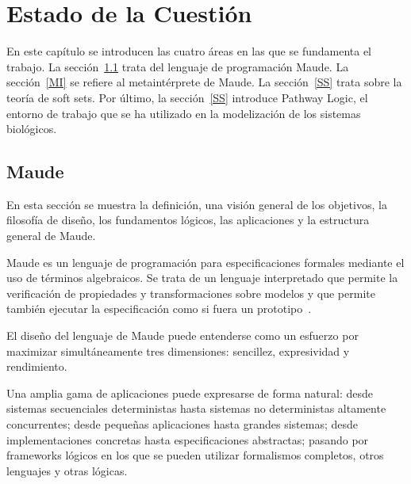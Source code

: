 
\chapter{Estado de la Cuestión}
\label{cap:estadoDeLaCuestion}

En este capítulo se introducen las cuatro áreas en las que se fundamenta el trabajo.
La sección~\ref{Maude} trata del lenguaje de programación Maude.
La sección~\ref{MI} se refiere al metaintérprete de Maude.
La sección~\ref{SS} trata sobre la teoría de soft sets.
Por último, la sección~\ref{SS} introduce Pathway Logic, el entorno de trabajo que se ha utilizado en la modelización de los sistemas biológicos.


\section{Maude}\label{Maude}

En esta sección se muestra la definición, una visión general de los objetivos, la filosofía de diseño, los fundamentos lógicos, las aplicaciones y la estructura general de Maude.
\smallskip

Maude es un lenguaje de programación para especificaciones formales mediante el uso de términos algebraicos. Se trata de un lenguaje interpretado que permite la verificación de propiedades y transformaciones sobre modelos y que permite también ejecutar la especificación como si fuera un prototipo~\citep{maude30}.
\smallskip


El diseño del lenguaje de Maude puede entenderse como un esfuerzo por maximizar simultáneamente tres dimensiones: sencillez, expresividad y rendimiento.

Una amplia gama de aplicaciones puede expresarse de forma natural: desde sistemas secuenciales deterministas hasta sistemas no deterministas altamente concurrentes; desde pequeñas aplicaciones hasta grandes sistemas; desde implementaciones concretas hasta especificaciones abstractas; pasando por frameworks lógicos en los que se pueden utilizar formalismos completos, otros lenguajes y otras lógicas.

